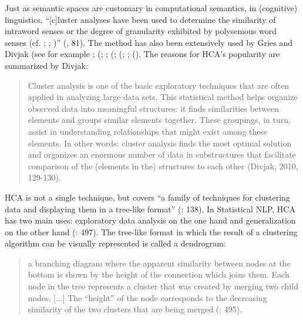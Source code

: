 Just as semantic spaces are customary in computational semantics, in (cognitive) linguistics, “[c]luster analyses have been used to determine the similarity of intraword senses or the degree of granularity exhibited by polysemous word senses (cf. \citealt{steinberg_empirical_1971}; \citealt{sandra_network_1995}; \citealt{putz_prepositional_1996})” (\citealt{Gries2006b}, 81). The method has also been extensively used by Gries and Divjak (see for example \citealt{divjak_ways_2006, divjak_structuring_2010}; (\citealt{glynn_cluster_2014}; \citealt{divjak_ways_2006, evans_behavioral_2009}; (\citealt{Gries2006}; (\citealt{evans_behavioral_2009}; \citealt{gries_behavioral_2010}; (\citealt{deshors_case_2014}). The reasons for HCA’s popularity are summarized by Divjak:


\begin{quote}
Cluster analysis is one of the basic exploratory techniques that are often applied in analyzing large data sets. This statistical method helps organize observed data into meaningful structures: it finds similarities between elements and groups similar elements together. These groupings, in turn, assist in understanding relationships that might exist among these elements. In other words: cluster analysis finds the most optimal solution and organizes an enormous number of data in substructures that facilitate comparison of the (elements in the) structures to each other (Divjak, 2010, 129-130).
\end{quote}


HCA is not a single technique, but covers “a family of techniques for clustering data and displaying them in a tree-like format” (\citealt{baayen_analyzing_2008}: 138). In Statistical NLP, HCA has two main uses: exploratory data analysis on the one hand and generalization on the other hand (\citealt{manning_foundations_1999}: 497). The tree-like format in which the result of a clustering algorithm can be visually represented is called a dendrogram:


\begin{quote}
a branching diagram where the apparent similarity between nodes at the bottom is shown by the height of the connection which joins them. Each node in the tree represents a cluster that was created by merging two child nodes. [...] The “height” of the node corresponds to the decreasing similarity of the two clusters that are being merged (\citealt{manning_foundations_1999}: 495).
\end{quote}


